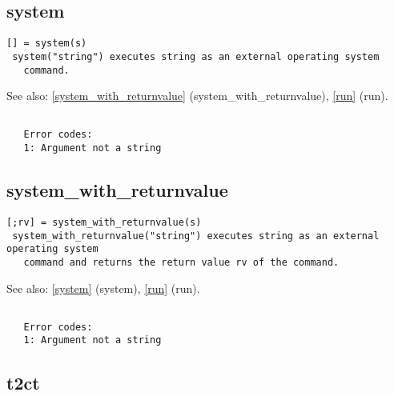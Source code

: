 \documentclass[a4paper]{article}
\begin{document}
\subsection{system\label{system}}

\begin{tscreen}
\begin{verbatim}
[] = system(s)
 system("string") executes string as an external operating system
   command.
\end{verbatim}

See also: \ref{system_with_returnvalue} {(system\_with\_returnvalue)}, \ref{run} {(run)}.
\begin{verbatim}

   Error codes:
   1: Argument not a string 
\end{verbatim}
\end{tscreen}



\subsection{system\_with\_returnvalue\label{system_with_returnvalue}}

\begin{tscreen}
\begin{verbatim}
[;rv] = system_with_returnvalue(s)
 system_with_returnvalue("string") executes string as an external operating system
   command and returns the return value rv of the command.
\end{verbatim}

See also: \ref{system} {(system)}, \ref{run} {(run)}.
\begin{verbatim}

   Error codes:
   1: Argument not a string 
\end{verbatim}
\end{tscreen}



\subsection{t2ct\label{t2ct}}
\end{document}
